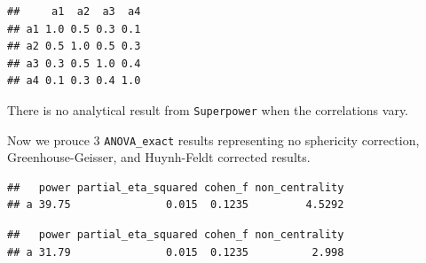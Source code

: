 \documentclass[]{book}
\newenvironment{Shaded}{\begin{snugshade}}{\end{snugshade}}
\newcommand{\DataTypeTok}[1]{\textcolor[rgb]{0.13,0.29,0.53}{#1}}
\newcommand{\KeywordTok}[1]{\textcolor[rgb]{0.13,0.29,0.53}{\textbf{#1}}}
\newcommand{\NormalTok}[1]{#1}
\newcommand{\OperatorTok}[1]{\textcolor[rgb]{0.81,0.36,0.00}{\textbf{#1}}}
\newcommand{\OtherTok}[1]{\textcolor[rgb]{0.56,0.35,0.01}{#1}}
\newcommand{\StringTok}[1]{\textcolor[rgb]{0.31,0.60,0.02}{#1}}
\begin{document}
\begin{verbatim}
##     a1  a2  a3  a4
## a1 1.0 0.5 0.3 0.1
## a2 0.5 1.0 0.5 0.3
## a3 0.3 0.5 1.0 0.4
## a4 0.1 0.3 0.4 1.0
\end{verbatim}

There is no analytical result from \texttt{Superpower} when the correlations vary.

Now we prouce 3 \texttt{ANOVA\_exact} results representing no sphericity correction, Greenhouse-Geisser, and Huynh-Feldt corrected results.

\begin{Shaded}
\end{Shaded}

\begin{verbatim}
##   power partial_eta_squared cohen_f non_centrality
## a 39.75               0.015  0.1235         4.5292
\end{verbatim}

\begin{Shaded}
\end{Shaded}

\begin{verbatim}
##   power partial_eta_squared cohen_f non_centrality
## a 31.79               0.015  0.1235          2.998
\end{verbatim}

\begin{Shaded}
\end{Shaded}
\end{document}
